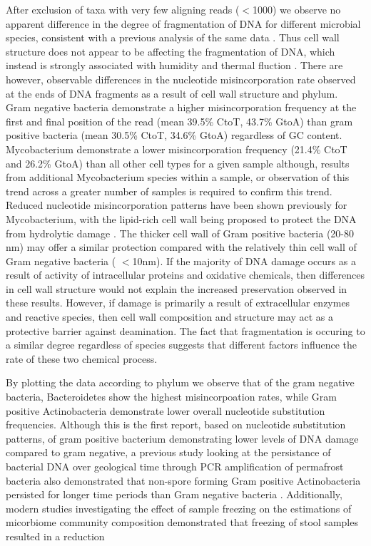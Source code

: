 \documentclass[12pt, a4paper]{article}
\begin{document}
After exclusion of taxa with very few aligning reads ($<$1000) we observe no apparent difference in the degree of fragmentation of DNA for different microbial species, consistent with a previous analysis of the same data \cite{Weyrich:2017aa}. 
Thus cell wall structure does not appear to be affecting the fragmentation of DNA, which instead is strongly associated with humidity and thermal fluction \cite{Kistler:2017}. 
There are however, observable differences in the nucleotide misincorporation rate observed at the ends of DNA fragments as a result of cell wall structure and phylum.
Gram negative bacteria demonstrate a higher misincorporation frequency at the first and final position of the read (mean 39.5\% CtoT, 43.7\% GtoA) than gram positive bacteria (mean 30.5\% CtoT, 34.6\% GtoA) regardless of GC content.
Mycobacterium demonstrate a lower misincorporation frequency (21.4\% CtoT and 26.2\% GtoA) than all other cell types for a given sample although, results from additional Mycobacterium species within a sample, or observation of this trend across a greater number of samples is required to confirm this trend.
Reduced nucleotide misincorporation patterns have been shown previously for Mycobacterium, with the lipid-rich cell wall being proposed to protect the DNA from hydrolytic damage \cite{Schuenemann:2013aa}.
The thicker cell wall of Gram positive bacteria (20-80 nm) may offer a similar protection compared with the relatively thin cell wall of Gram negative bacteria ( $<$10nm). 
If the majority of DNA damage occurs as a result of activity of intracellular proteins and oxidative chemicals, then differences in cell wall structure would not explain the increased preservation observed in these results. 
However, if damage is primarily a result of extracellular enzymes and reactive species, then cell wall composition and structure may act as a protective barrier against deamination. 
The fact that fragmentation is occuring to a similar degree regardless of species suggests that different factors influence the rate of these two chemical process.

By plotting the data according to phylum we observe that of the gram negative bacteria, Bacteroidetes show the highest misincorpoation rates, while Gram positive Actinobacteria demonstrate lower overall nucleotide substitution frequencies. 
Although this is the first report, based on nucleotide substitution patterns, of gram positive bacterium demonstrating lower levels of DNA damage compared to gram negative, a previous study looking at the persistance of bacterial DNA over geological time through PCR amplification of permafrost bacteria also demonstrated that non-spore forming Gram positive Actinobacteria persisted for longer time periods than Gram negative bacteria \cite{Willerslev:2004aa}.
Additionally, modern studies investigating the effect of sample freezing on the estimations of micorbiome community composition demonstrated that freezing of stool samples resulted in a reduction 
\end{document}
